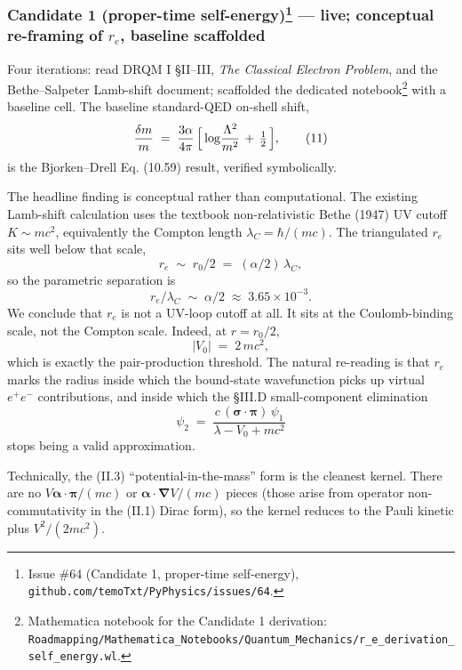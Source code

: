 \documentclass[
  11pt,
]{article}
\begin{document}
\hypertarget{candidate-1-proper-time-self-energy3-live-conceptual-re-framing-of-r_e-baseline-scaffolded}{%
\subsubsection[Candidate 1 (proper-time self-energy) --- live;
conceptual re-framing of \(r_e\), baseline
scaffolded]{\texorpdfstring{Candidate 1 (proper-time
self-energy)\footnote{Issue \#64 (Candidate 1, proper-time self-energy),
  \texttt{github.com/temoTxt/PyPhysics/issues/64}.} --- live; conceptual
re-framing of \(r_e\), baseline
scaffolded}{Candidate 1 (proper-time self-energy) --- live; conceptual re-framing of r\_e, baseline scaffolded}}\label{candidate-1-proper-time-self-energy3-live-conceptual-re-framing-of-r_e-baseline-scaffolded}}

Four iterations: read DRQM I §II--III, \emph{The Classical Electron
Problem}, and the Bethe--Salpeter Lamb-shift document; scaffolded the
dedicated notebook\footnote{Mathematica notebook for the Candidate 1
  derivation:
  \texttt{Roadmapping/Mathematica\_Notebooks/Quantum\_Mechanics/r\_e\_derivation\_self\_energy.wl}.}
with a baseline cell. The baseline standard-QED on-shell shift, \[
\frac{\delta m}{m} \;=\; \frac{3\alpha}{4\pi}\,\Bigl[\,\log\!\frac{\Lambda^2}{m^2} \,+\, \tfrac{1}{2}\,\Bigr], \tag{11}
\] is the Bjorken--Drell Eq. (10.59) result, verified symbolically.

The headline finding is conceptual rather than computational. The
existing Lamb-shift calculation uses the textbook non-relativistic Bethe
(1947) UV cutoff \(K \sim m c^2\), equivalently the Compton length
\(\lambda_C = \hbar/(mc)\). The triangulated \(r_e\) sits well below
that scale, \[
r_e \;\sim\; r_0/2 \;=\; (\alpha/2)\,\lambda_C, \tag{12}
\] so the parametric separation is \[
r_e / \lambda_C \;\sim\; \alpha/2 \;\approx\; 3.65 \times 10^{-3}. \tag{13}
\] We conclude that \(r_e\) is not a UV-loop cutoff at all. It sits at
the Coulomb-binding scale, not the Compton scale. Indeed, at
\(r = r_0/2\), \[
\lvert V_0 \rvert \;=\; 2\,m c^2, \tag{14}
\] which is exactly the pair-production threshold. The natural
re-reading is that \(r_e\) marks the radius inside which the bound-state
wavefunction picks up virtual \(e^+ e^-\) contributions, and inside
which the §III.D small-component elimination \[
\psi_2 \;=\; \frac{c\,(\boldsymbol{\sigma}\!\cdot\!\boldsymbol{\pi})\,\psi_1}{\lambda - V_0 + m c^2} \tag{15}
\] stops being a valid approximation.

Technically, the (II.3) ``potential-in-the-mass'' form is the cleanest
kernel. There are no
\(V \boldsymbol{\alpha}\!\cdot\!\boldsymbol{\pi}/(mc)\) or
\(\boldsymbol{\alpha}\!\cdot\!\boldsymbol{\nabla} V/(mc)\) pieces (those
arise from operator non-commutativity in the (II.1) Dirac form), so the
kernel reduces to the Pauli kinetic plus \(V^2/(2 m c^2)\).
\end{document}

